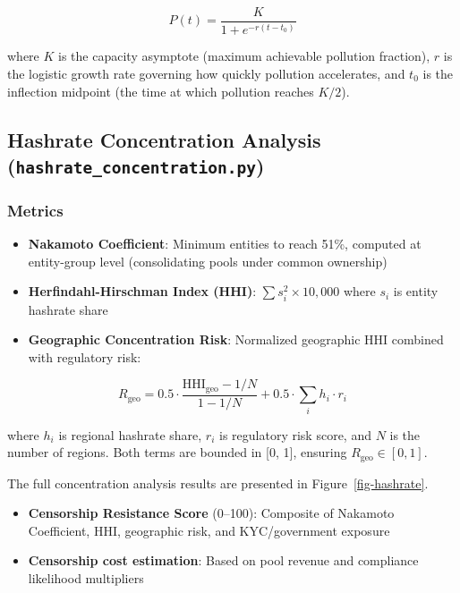 \documentclass[
  11pt,
]{article}
\providecommand{\tightlist}{%
  \setlength{\itemsep}{0pt}\setlength{\parskip}{0pt}}\usepackage{longtable,booktabs,array}
\let\oldsubsection\subsection
\renewcommand{\subsection}[1]{\FloatBarrier\oldsubsection{#1}}
\begin{document}
\[P(t) = \frac{K}{1 + e^{-r(t - t_0)}}\]

where \(K\) is the capacity asymptote (maximum achievable pollution
fraction), \(r\) is the logistic growth rate governing how quickly
pollution accelerates, and \(t_0\) is the inflection midpoint (the time
at which pollution reaches \(K/2\)).

\hypertarget{hashrate-concentration-analysis-hashrate_concentration.py}{%
\subsection{\texorpdfstring{Hashrate Concentration Analysis
(\texttt{hashrate\_concentration.py})}{Hashrate Concentration Analysis (hashrate\_concentration.py)}}\label{hashrate-concentration-analysis-hashrate_concentration.py}}

\hypertarget{metrics}{%
\subsubsection{Metrics}\label{metrics}}

\begin{itemize}
\tightlist
\item
  \textbf{Nakamoto Coefficient}: Minimum entities to reach 51\%,
  computed at entity-group level (consolidating pools under common
  ownership)
\item
  \textbf{Herfindahl-Hirschman Index (HHI)}:
  \(\sum s_i^2 \times 10{,}000\) where \(s_i\) is entity hashrate share
\item
  \textbf{Geographic Concentration Risk}: Normalized geographic HHI
  combined with regulatory risk:
\end{itemize}

\[R_{\text{geo}} = 0.5 \cdot \frac{\text{HHI}_{\text{geo}} - 1/N}{1 - 1/N} + 0.5 \cdot \sum_i h_i \cdot r_i\]

where \(h_i\) is regional hashrate share, \(r_i\) is regulatory risk
score, and \(N\) is the number of regions. Both terms are bounded in
{[}0, 1{]}, ensuring \(R_{\text{geo}} \in [0, 1]\).

The full concentration analysis results are presented in
Figure~\ref{fig-hashrate}.

\begin{itemize}
\tightlist
\item
  \textbf{Censorship Resistance Score} (0--100): Composite of Nakamoto
  Coefficient, HHI, geographic risk, and KYC/government exposure
\item
  \textbf{Censorship cost estimation}: Based on pool revenue and
  compliance likelihood multipliers
\end{itemize}
\end{document}
